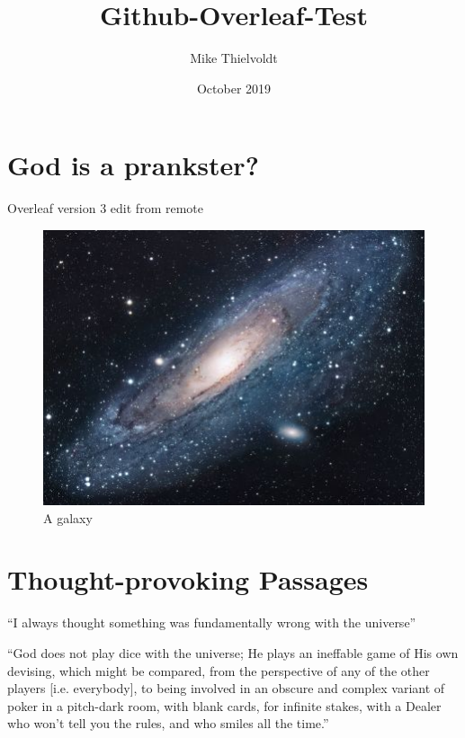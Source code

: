 \documentclass{article}
\title{Github-Overleaf-Test}
\author{Mike Thielvoldt}
\date{October 2019}
\begin{document}
\maketitle

\section{God is a prankster?}

Overleaf version 3 edit from remote

\begin{figure}[h!]
\centering
\includegraphics[scale=1.7]{universe}
\caption{A galaxy}
\label{fig:universe}
\end{figure}


\section{Thought-provoking Passages}
``I always thought something was fundamentally wrong with the universe'' \citep{adams1995hitchhiker}
\newline

``God does not play dice with the universe; He plays an ineffable game of His own devising, which might be compared, from the perspective of any of the other players [i.e. everybody], to being involved in an obscure and complex variant of poker in a pitch-dark room, with blank cards, for infinite stakes, with a Dealer who won't tell you the rules, and who smiles all the time.'' \citep{pratchett1990goodomens}



\end{document}
